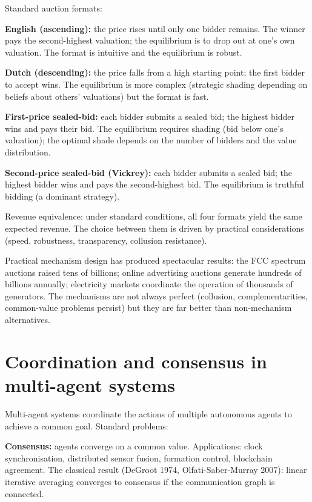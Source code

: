 Standard auction formats:

\textbf{English (ascending):} the price rises until only one bidder remains. The winner pays the second-highest valuation; the equilibrium is to drop out at one's own valuation. The format is intuitive and the equilibrium is robust.

\textbf{Dutch (descending):} the price falls from a high starting point; the first bidder to accept wins. The equilibrium is more complex (strategic shading depending on beliefs about others' valuations) but the format is fast.

\textbf{First-price sealed-bid:} each bidder submits a sealed bid; the highest bidder wins and pays their bid. The equilibrium requires shading (bid below one's valuation); the optimal shade depends on the number of bidders and the value distribution.

\textbf{Second-price sealed-bid (Vickrey):} each bidder submits a sealed bid; the highest bidder wins and pays the second-highest bid. The equilibrium is truthful bidding (a dominant strategy).

Revenue equivalence: under standard conditions, all four formats yield the same expected revenue. The choice between them is driven by practical considerations (speed, robustness, transparency, collusion resistance).

Practical mechanism design has produced spectacular results: the FCC spectrum auctions raised tens of billions; online advertising auctions generate hundreds of billions annually; electricity markets coordinate the operation of thousands of generators. The mechanisms are not always perfect (collusion, complementarities, common-value problems persist) but they are far better than non-mechanism alternatives.

\section{Coordination and consensus in multi-agent systems}

Multi-agent systems coordinate the actions of multiple autonomous agents to achieve a common goal. Standard problems:

\textbf{Consensus:} agents converge on a common value. Applications: clock synchronisation, distributed sensor fusion, formation control, blockchain agreement. The classical result (DeGroot 1974, Olfati-Saber-Murray 2007): linear iterative averaging converges to consensus if the communication graph is connected.

